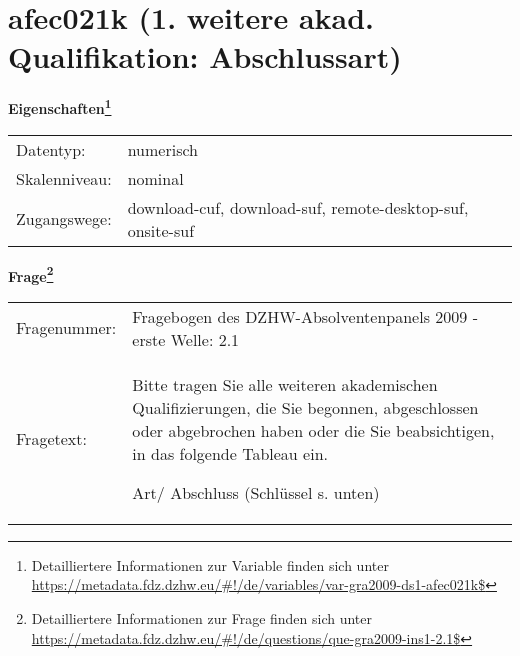 
    \setcounter{footnote}{0}

    \vspace*{-1.8cm}
	\section{afec021k (1. weitere akad. Qualifikation: Abschlussart)}
	\label{section:afec021k}



    \vspace*{0.5cm}
    \noindent\textbf{Eigenschaften\footnote{Detailliertere Informationen zur Variable finden sich unter
		\url{https://metadata.fdz.dzhw.eu/\#!/de/variables/var-gra2009-ds1-afec021k$}}}\\
	\begin{tabularx}{\hsize}{@{}lX}
	Datentyp: & numerisch \\
	Skalenniveau: & nominal \\
	Zugangswege: &
	  download-cuf, 
	  download-suf, 
	  remote-desktop-suf, 
	  onsite-suf
 \\
    \end{tabularx}



				\vspace*{0.5cm}
                \noindent\textbf{Frage\footnote{Detailliertere Informationen zur Frage finden sich unter
		              \url{https://metadata.fdz.dzhw.eu/\#!/de/questions/que-gra2009-ins1-2.1$}}}\\
				\begin{tabularx}{\hsize}{@{}lX}
					Fragenummer: &
					  Fragebogen des DZHW-Absolventenpanels 2009 - erste Welle:
					  2.1
 \\
					Fragetext: & Bitte tragen Sie alle weiteren akademischen Qualifizierungen, die Sie begonnen, abgeschlossen oder abgebrochen haben oder die Sie beabsichtigen, in das folgende Tableau ein.\par  Art/ Abschluss (Schlüssel s. unten) \\
				\end{tabularx}






